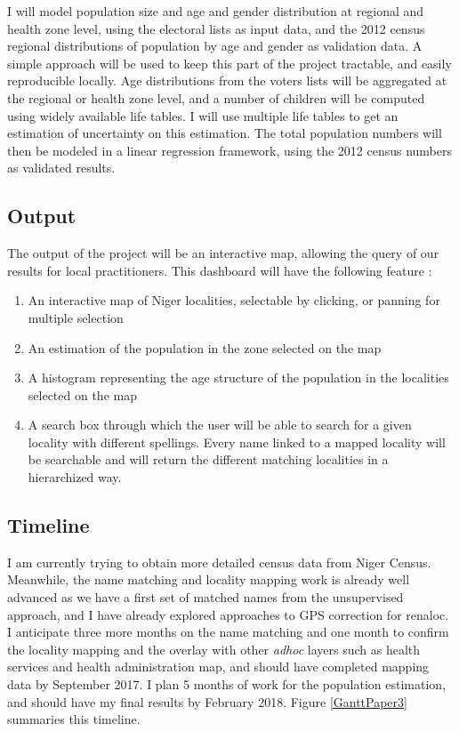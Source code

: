 I will model population size and age and gender distribution at regional and health zone level, using the electoral lists as input data, and the 2012 census regional distributions of population by age and gender as validation data. A simple approach will be used to keep this part of the project tractable, and easily reproducible locally. Age distributions from the voters lists will be aggregated at the regional or health zone level, and a number of children will be computed using widely available life tables. I will use multiple life tables to get an estimation of uncertainty on this estimation. The total population numbers will then be modeled in a linear regression framework, using the 2012 census numbers as validated results.

\subsection{Output}

The output of the project will  be an interactive map, allowing the query of our results for local practitioners. This dashboard will have the following feature :
\begin{enumerate}
	\item An interactive map of Niger localities, selectable by clicking, or panning for multiple selection
	\item An estimation of the population in the zone selected on the map
	\item A histogram representing the age structure of the population in the localities selected on the map
	\item A search box through which the user will be able to search for a given locality with different spellings. Every name linked to a mapped locality will be searchable and will return the different matching localities in a hierarchized way.
\end{enumerate}



\subsection{Timeline}
\label{timeline:aim2}
I am currently trying to obtain more detailed census data from Niger Census. Meanwhile, the name matching and locality mapping work is already well advanced as we have a first set of matched names from the unsupervised approach, and I have already explored approaches to GPS correction for \gls{renaloc}. I anticipate three more months on the name matching and one month to confirm the locality mapping and the overlay with other \textit{adhoc} layers such as health services and health administration map, and should have completed mapping data by September 2017. I plan 5 months of work for the population estimation, and should have my final results by February 2018. Figure \ref{GanttPaper3} summaries this timeline.

